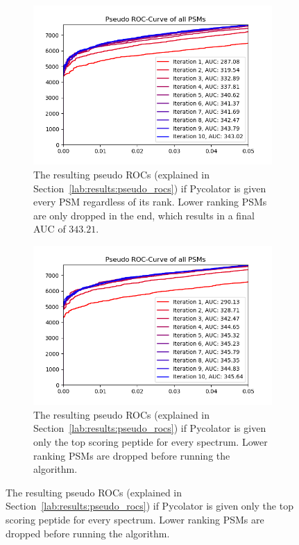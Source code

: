 \begin{figure}
	\normalsize
	\centering
	\begin{subfigure}{0.49\textwidth}
		\includegraphics[width = \textwidth]{figures/allRanks.png}
		\caption[Result of dropping lower ranks at the end]{The resulting pseudo ROCs (explained in Section~\ref{lab:results:pseudo_rocs}) if Pycolator is given every PSM regardless of its rank. Lower ranking PSMs are only dropped in the end, which results in a final AUC of $343.21$.}
		\label{fig:all_ranks}
	\end{subfigure}
	\hfill
	\begin{subfigure}{0.49\textwidth}
		\includegraphics[width = \textwidth]{figures/onlyFirstRank.png}
		\caption[Result of dropping lower ranks at the start]{The resulting pseudo ROCs (explained in Section~\ref{lab:results:pseudo_rocs}) if Pycolator is given only the top scoring peptide for every spectrum. Lower ranking PSMs are dropped before running the algorithm.}

\end{subfigure}
\end{figure}
